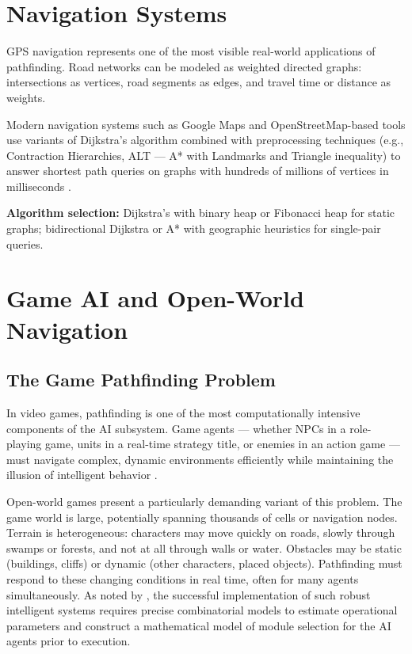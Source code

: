 \documentclass[12pt, a4paper, oneside]{report}
\theoremstyle{definition}
\begin{document}
\section{Navigation Systems}

GPS navigation represents one of the most visible real-world applications of pathfinding. Road networks can be modeled as weighted directed graphs: intersections as vertices, road segments as edges, and travel time or distance as weights.

Modern navigation systems such as Google Maps and OpenStreetMap-based tools use variants of Dijkstra's algorithm combined with preprocessing techniques (e.g., Contraction Hierarchies, ALT — A* with Landmarks and Triangle inequality) to answer shortest path queries on graphs with hundreds of millions of vertices in milliseconds \citep{bauer2010, xomnia, builtin}.

\textbf{Algorithm selection:} Dijkstra's with binary heap or Fibonacci heap for static graphs; bidirectional Dijkstra or A* with geographic heuristics for single-pair queries.

\section{Game AI and Open-World Navigation}

\subsection{The Game Pathfinding Problem}

In video games, pathfinding is one of the most computationally intensive components of the AI subsystem. Game agents — whether NPCs in a role-playing game, units in a real-time strategy title, or enemies in an action game — must navigate complex, dynamic environments efficiently while maintaining the illusion of intelligent behavior \citep{numberdyslexia}. 

Open-world games present a particularly demanding variant of this problem. The game world is large, potentially spanning thousands of cells or navigation nodes. Terrain is heterogeneous: characters may move quickly on roads, slowly through swamps or forests, and not at all through walls or water. Obstacles may be static (buildings, cliffs) or dynamic (other characters, placed objects). Pathfinding must respond to these changing conditions in real time, often for many agents simultaneously. As noted by \citet{koliechkina2024}, the successful implementation of such robust intelligent systems requires precise combinatorial models to estimate operational parameters and construct a mathematical model of module selection for the AI agents prior to execution.
\end{document}
